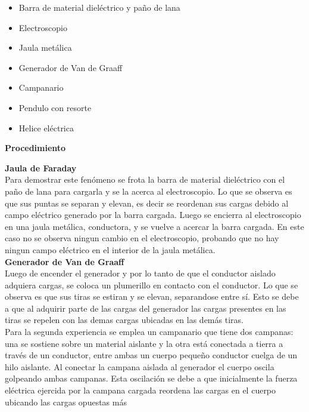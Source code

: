 \documentclass[11pt, letterpaper]{article}
\begin{document}
    \begin{itemize}
        \item Barra de material dieléctrico y paño de lana
        \item Electroscopio
        \item Jaula metálica
        \item Generador de Van de Graaff
        \item Campanario
        \item Pendulo con resorte
        \item Helice eléctrica
    \end{itemize}
\pagebreak
\begin{center}\textbf{Procedimiento}\end{center}
    \textbf{Jaula de Faraday}\\
        Para demostrar este fenómeno se frota la barra de material 
        dieléctrico con el paño de lana para cargarla y se la
        acerca al electroscopio. Lo que se observa es que sus 
        puntas se separan y elevan, es decir se reordenan sus 
        cargas debido al campo eléctrico generado por la barra
        cargada. Luego se encierra al electroscopio en una jaula
        metálica, conductora, y se vuelve a acercar la barra
        cargada. En este caso no se observa ningun cambio en el
        electroscopio, probando que no hay ningun campo eléctrico
        en el interior de la jaula metálica.\\
    \textbf{Generador de Van de Graaff}\\
        Luego de encender el generador y por lo tanto de que el 
        conductor aislado adquiera cargas, se coloca un plumerillo
        en contacto con el conductor. Lo que se observa es que
        sus tiras se estiran y se elevan, separandose entre sí.
        Esto se debe a que al adquirir parte de las cargas del 
        generador las cargas presentes en las tiras se repelen
        con las demas cargas ubicadas en las demás tiras.\\
        Para la segunda experiencia se emplea un campanario
        que tiene dos campanas: una se sostiene sobre un material 
        aislante y la otra está conectada a tierra a través de un
        conductor, entre ambas un cuerpo pequeño conductor cuelga
        de un hilo aislante. Al conectar la campana aislada al 
        generador el cuerpo oscila golpeando ambas campanas.
        Esta oscilación se debe a que inicialmente la fuerza 
        eléctrica ejercida por la campana cargada reordena las
        cargas en el cuerpo ubicando las cargas opuestas más 
\end{document}
